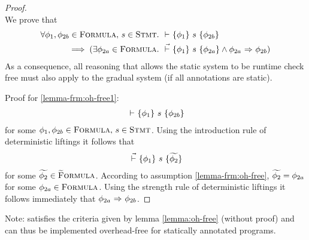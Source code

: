 \begin{proof}~\\
    We prove that 
    \begin{align}
    \begin{split}
    \label{frm:oh-free1}
    \forall \phi_1, \phi_{2b} \in \textup{\textsc{Formula}},\, s \in \textup{\textsc{Stmt}}.~
    &{} \,\,{\vdash}\,\, \{{\phi_1}\} ~{s}~ \{{\phi_{2b}}\} \\
    \implies 
    (\exists \phi_{2a} \in \textup{\textsc{Formula}}.~ &{} \,\,\vec{\vdash}\,\, \{{\phi_1}\} ~{s}~ \{{\phi_{2a}}\} \wedge {\phi_{2a}} \,\,{\Rightarrow}\,\, {\phi_{2b}})
    \end{split}
    \end{align}
    As a consequence, all reasoning that allows the static system to be runtime check free must also apply to the gradual system (if all annotations are static).
    
    Proof for \ref{lemma-frm:oh-free1}:
    \begin{align*}
    {} \,\,{\vdash}\,\, \{{\phi_1}\} ~{s}~ \{{\phi_{2b}}\}
    \end{align*}
    for some $\phi_1, \phi_{2b} \in \textup{\textsc{Formula}},\, s \in \textup{\textsc{Stmt}}$.
    Using the introduction rule of deterministic liftings it follows that
    \begin{align*}
    {} \,\,\vec{\vdash}\,\, \{{\phi_1}\} ~{s}~ \{{\widetilde{\phi_2}}\}
    \end{align*}
    for some $\widetilde{\phi_2} \in \textup{\textsc{\ensuremath{\widetilde{\text{F}}}ormula}}$.
    According to assumption \ref{lemma-frm:oh-free}, $\widetilde{\phi_2} = \phi_{2a}$ for some $\phi_{2a} \in \textup{\textsc{Formula}}$.
    Using the strength rule of deterministic liftings it follows immediately that ${\phi_{2a}} \,\,{\Rightarrow}\,\, {\phi_{2b}}$.

\begin{comment}
    Proof for claim that optimality of $\dgthoare{}{\cdot}{\cdot}{\cdot}$ implies \ref{lemma-frm:oh-free} if \tset{\dgradT Soundness} holds.
    Let $\Phi \defeq \{~ \phi_2 ~|~ \thoare{}{\phi_1}{s}{\phi_2} ~\}$ for some  $\phi_1 \in \setFormula,\, s \in \setStmt$.
    $\Phi$ is the set of all deducible postconditions for given precondition and statement.
    If $\Phi$ is not empty, then the introduction rule of deterministic liftings implies that
    $\dgthoare{}{\phi_1}{s}{\grad{\phi_2}}$ for some $\grad{\phi_2} \in \setGFormula$.
    \begin{description}
        \item[Case 1: $\exists \pi_1, \pi_2.~ \sstepConsume{s}{\pi_1}{\pi_2} \wedge \evalphiGen{\pi_1}{\phi_1}$]~\\
        Due to soundness of the static system, it follows that
        \begin{displaymath}
        \forall \phi_2 \in \Phi.~ \evalphiGen{\pi_2}{\phi_2}
        \end{displaymath}
    \end{description}
    \end{comment}
\end{proof}

Note: \gvlidf satisfies the criteria given by lemma \ref{lemma:oh-free} (without proof) and can thus be implemented overhead-free for statically annotated programs.
